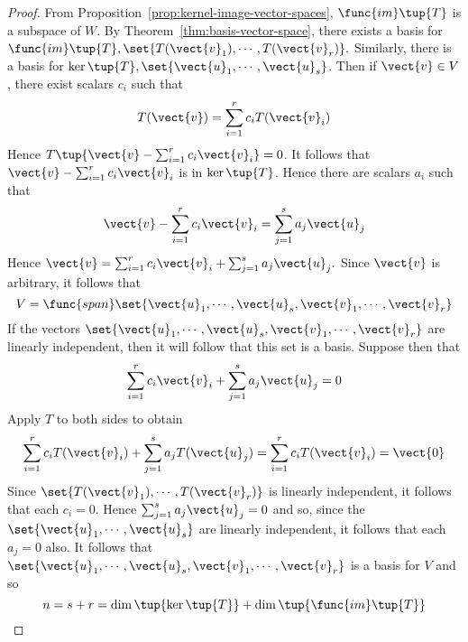 \begin{proof}
From Proposition~\ref{prop:kernel-image-vector-spaces}, $\func{im}\tup{T} $
is a subspace of $W$. By Theorem~\ref{thm:basis-vector-space}, there exists a basis for $
\func{im}\tup{T} ,\set{T(\vect{v}_{1}),\cdots ,T(\vect{v}_{r})}
. $ Similarly, there is a basis for $\ker \tup{T} ,\set{\vect{u}
_{1},\cdots ,\vect{u}_{s}}$. Then if $\vect{v}\in V$, there exist
scalars $c_{i}$ such that 
\begin{equation*}
T(\vect{v})=\sum_{i=1}^{r}c_{i}T(\vect{v}_{i})
\end{equation*}
Hence $T\tup{\vect{v}-\sum_{i=1}^{r}c_{i}\vect{v}_{i}} =0$. It follows
that $\vect{v}-\sum_{i=1}^{r}c_{i}\vect{v}_{i}$ is in $\ker \tup{T}$.
Hence there are scalars $a_{i}$ such that 
\begin{equation*}
\vect{v}-\sum_{i=1}^{r}c_{i}\vect{v}_{i}=\sum_{j=1}^{s}a_{j}\vect{u}_{j}
\end{equation*}
Hence $\vect{v}=\sum_{i=1}^{r}c_{i}\vect{v}_{i}+\sum_{j=1}^{s}a_{j}\vect{u}
_{j}. $ Since $\vect{v}$ is arbitrary, it follows that 
\begin{equation*}
V=\func{span}\set{\vect{u}_{1},\cdots ,\vect{u}_{s},\vect{v}_{1},\cdots ,
\vect{v}_{r}}
\end{equation*}
If the vectors $\set{\vect{u}_{1},\cdots ,\vect{u}_{s},\vect{v}_{1},\cdots ,
\vect{v}_{r}} $ are linearly independent, then it will follow that
this set is a basis. Suppose then that 
\begin{equation*}
\sum_{i=1}^{r}c_{i}\vect{v}_{i}+\sum_{j=1}^{s}a_{j}\vect{u}_{j}=0
\end{equation*}
Apply $T$ to both sides to obtain 
\begin{equation*}
\sum_{i=1}^{r}c_{i}T(\vect{v}_{i})+\sum_{j=1}^{s}a_{j}T(\vect{u}
_{j})=\sum_{i=1}^{r}c_{i}T(\vect{v}_{i})= \vect{0}
\end{equation*}
Since $\set{T(\vect{v}_{1}),\cdots ,T(\vect{v}_{r})} $ is linearly
independent, it follows that each $c_{i}=0$. Hence $\sum_{j=1}^{s}a_{j}\vect{u
}_{j}=0$ and so, since the $\set{\vect{u}_{1},\cdots ,\vect{u}_{s}} $
are linearly independent, it follows that each $a_{j}=0$ also. It follows
that $\set{\vect{u}_{1},\cdots ,\vect{u}_{s},\vect{v}_{1},\cdots ,\vect{v}
_{r}} $ is a basis for $V$ and so 
\begin{equation*}
n=s+r=\dim \tup{\ker \tup{T} } +\dim \tup{\func{im}\tup{
T} }
\end{equation*}
\end{proof}

